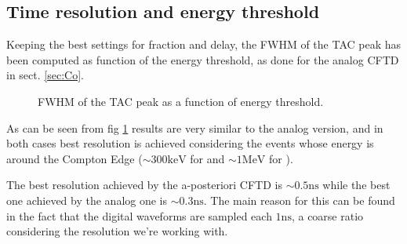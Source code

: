 \documentclass[11pt,a4 paper]{article}
\begin{document}
\subsection{Time resolution and energy threshold}
Keeping the best settings for fraction and delay, the FWHM of the TAC peak has been computed as function of the energy threshold, as done for the analog CFTD in sect. \ref{sec:Co}.

\begin{figure}[H]
    \centering
    \caption{FWHM of the TAC peak as a function of energy threshold.}
    \label{fig:FWHM:sim}
\end{figure}

As can be seen from fig \ref{fig:FWHM:sim} results are very similar to the analog version, and in both cases best resolution is achieved considering the events whose energy is around the Compton Edge ($\sim 300\si{\kilo\electronvolt}$ for  and $\sim 1\si{\mega\electronvolt}$ for ).

The best resolution achieved by the a-posteriori CFTD is $\sim0.5\si{\nano\second}$ while the best one achieved by the analog one is $\sim0.3\si{\nano\second}$. The main reason for this can be found in the fact that the digital waveforms are sampled each $1\si{\nano\second}$, a coarse ratio considering the resolution we're working with.


\end{document}
